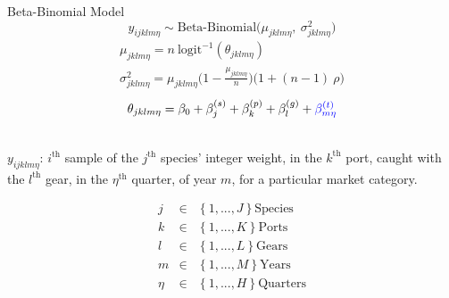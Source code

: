\documentclass[ xcolor = pdftex, dvipsnames, table ]{beamer}
\begin{document}
%
%

%
\begin{frame}{Beta-Binomial Model}
\vspace{-0.5cm}
\begin{equation*}
        y_{ijklm\eta} \sim \text{Beta-Binomial}\Big(\mu_{jklm\eta},~\sigma^2_{jklm\eta} \Big)
\end{equation*}
\vspace{-0.7cm}
\begin{gather*}
        \mu_{jklm\eta} = n~\text{logit}^{-1}(\theta_{jklm\eta})\\
        \sigma^2_{jklm\eta} = \mu_{jklm\eta}\Big(1-\frac{\mu_{jklm\eta}}{n}\Big)\Big(1+(n-1)~\rho\Big)
\end{gather*}
\vspace{-0.2cm}
\begin{equation*}
        \theta_{jklm\eta} = \beta_0 + \beta^{(s)}_j + \beta^{(p)}_k + \beta^{(g)}_l + \color{blue}{\beta^{(t)}_{m\eta}}%
\end{equation*}
\hspace{-0.5cm}
\begin{minipage}[h!]{0.55\textwidth}
        $~$\\
        $y_{ijklm\eta}$: $i^{\text{th}}$ sample of the $j^{\text{th}}$ species' integer weight, in the $k^{\text{th}}$ port, caught with the $l^{\text{th}}$ gear, in the $\eta^{\text{th}}$ \mbox{quarter,} of year $m$, for a particular market \mbox{category.}
\end{minipage}
\begin{minipage}{0.45\textwidth}
        \vspace{-0.5cm}
        \hspace{4cm}
        \begin{eqnarray*}
        j &\in&\left\{1, ..., J\right\} \text{Species}\\
        k &\in&\left\{1, ..., K\right\} \text{Ports}\\
        l &\in&\left\{1, ..., L\right\} \text{Gears}\\
        m &\in&\left\{1, ..., M\right\} \text{Years}\\
        \eta &\in&\left\{1, ..., H\right\} \text{Quarters}
        \end{eqnarray*}
\end{minipage}
\end{frame}
\end{document}
